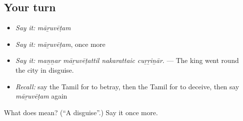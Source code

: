 \subsection*{Your turn}
\begin{itemize}
\raggedright
  \item \emph{Say it:} \emph{māṟuvēṭam}
  \item \emph{Say it:} \emph{māṟuvēṭam}, once more
  \item \emph{Say it:} \emph{maṉṉar māṟuvēṭattil nakarattaic cuṟṟiṉār.} — The king went round the city in disguise.
  \item \emph{Recall:} say the Tamil for to betray, then the Tamil for to deceive, then say \emph{māṟuvēṭam} again
\end{itemize}

\begin{tcolorbox}[breakable,colback=teal!4,colframe=teal!35!black,title={Before you move on}]
What does  mean? (\textquotedblleft{}A disguise\textquotedblright{}.) Say it once more.
\end{tcolorbox}
